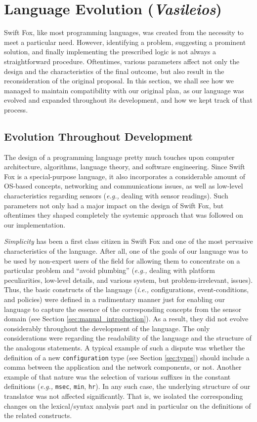 \section{Language Evolution (\textit{Vasileios})}
\label{sec:language_evolution}

Swift Fox, like most programming languages, was created from the necessity
to meet a particular need. However, identifying a problem, suggesting a
prominent solution, and finally implementing the prescribed logic is not
always a straightforward procedure. Oftentimes, various parameters affect
not only the design and the characteristics of the final outcome, but also
result in the reconsideration of the original proposal. In this section, we
shall see how we managed to maintain compatibility with our original
plan, as our language was evolved and expanded throughout its development,
and how we kept track of that process.

\subsection{Evolution Throughout Development}

The design of a programming language pretty much touches upon computer
architecture, algorithms, language theory, and software engineering. Since
Swift Fox is a special-purpose language, it also incorporates a considerable
amount of OS-based concepts, networking and communications issues, as well
as low-level characteristics regarding sensors (\textit{e.g.,} dealing
with sensor readings). Such parameters not only had a major impact on the
design of Swift Fox, but oftentimes they shaped completely the systemic
approach that was followed on our implementation.

\textit{Simplicity} has been a first class citizen in Swift Fox and one of
the most pervasive characteristics of the language. After all, one of the
goals of our language was to be used by non-expert users of the field for
allowing them to concentrate on a particular problem and ``avoid
plumbing'' (\textit{e.g.,} dealing with platform peculiarities, low-level
details, and various system, but problem-irrelevant, issues). Thus, the
basic constructs of the language (\textit{i.e.,} configurations,
event-conditions, and policies) were defined in a rudimentary manner just
for enabling our language to capture the essence of the corresponding
concepts from the sensor domain (see Section
\ref{sec:manual_introduction}). As a result, they did not evolve
considerably throughout the development of the language. The only
considerations were regarding the readability of the language and the
structure of the analogous statements. A typical example of such a dispute
was whether the definition of a new \texttt{configuration} type (see
Section \ref{sec:types}) should include a comma between the application and
the network components, or not. Another example of that nature was the
selection of various suffixes in the constant definitions (\textit{e.g.,}
\texttt{msec}, \texttt{min}, \texttt{hr}). In any such case, the underlying
structure of our translator was not affected significantly. That is, we
isolated the corresponding changes on the lexical/syntax analysis part and 
in particular on the definitions of the related constructs.

